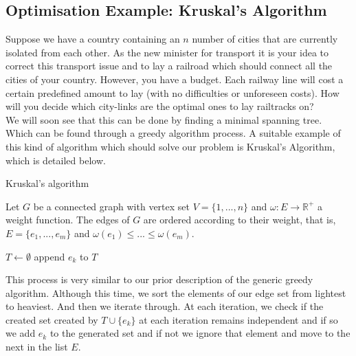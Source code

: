 \documentclass[../main.tex]{subfiles}
\begin{document}
\subsection{Optimisation Example: Kruskal's Algorithm}
\begin{exmp}
Suppose we have a country containing an $n$ number of cities that are currently isolated from each other.  As the new minister for transport it is your idea to correct this transport issue and to lay a railroad which should connect all the cities of your country. However, you have a budget. Each railway line will cost a certain predefined amount to lay (with no difficulties or unforeseen costs). How will you decide which city-links are the optimal ones to lay railtracks on?\\
\indent We will soon see that this can be done  by finding a minimal spanning tree. Which can be found through a greedy algorithm process. A suitable example of this kind of algorithm which should solve our problem is Kruskal's Algorithm, which is detailed below.
\end{exmp}

\begin{algorithm}[H]
\caption{Kruskal's algorithm}\label{kruskal}
Let $G$ be a connected graph with vertex set $V = \{1,...,n\}$ and $\omega:E \longrightarrow \mathbb{R^+}$ a weight function. The edges of $G$ are ordered according to their weight, that is, $E = \{e_1,...,e_m\}$ and $\omega(e_1) \leq ... \leq \omega(e_m).$
\begin{algorithmic}[1]
\State $T\gets \emptyset$
	 	\State append $e_k$ to $T$
	\EndIf
\EndFor
\EndProcedure
\end{algorithmic}
\end{algorithm}

This process is very similar to our prior description of the generic greedy algorithm. Although this time, we sort the elements of our edge set from lightest to heaviest. And then we iterate through. At each iteration, we check if the created set created by $T \cup \{e_k\}$ at each iteration remains independent and if so we add $e_k$ to the generated set and if not we ignore that element and move to the next in the list $E.$
\end{document}
